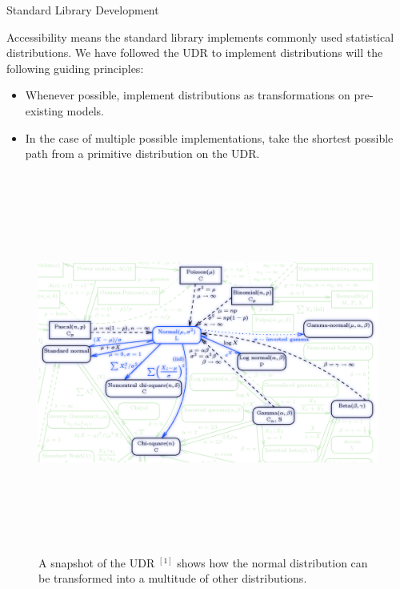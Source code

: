\documentclass[22pt]{beamer}
\begin{document}
\begin{frame}[fragile]
\begin{textblock}{5}
\begin{textblock}{5}

\begin{block}{\Large{Standard Library Development}}
\justifying

\footnotesize{Accessibility means the standard library implements commonly used statistical distributions. We have followed the UDR to implement distributions will the following guiding principles:


\footnotesize{

\bigskip
\begin{itemize}
  \item Whenever possible, implement distributions as transformations on pre-existing models.
  \item In the case of multiple possible implementations, take the shortest possible path from a primitive distribution on the UDR.
\end{itemize}
        }
}

\bigskip

\begin{figure}
\centering
\includegraphics[height=12.5cm]{UDR.png}
\caption{\tiny{A snapshot of the UDR $^{[1]}$ shows how the normal distribution can be transformed into a multitude of other distributions.}}
\end{figure}


\end{block}
\end{textblock}
\end{textblock}
\end{frame}
\end{document}
